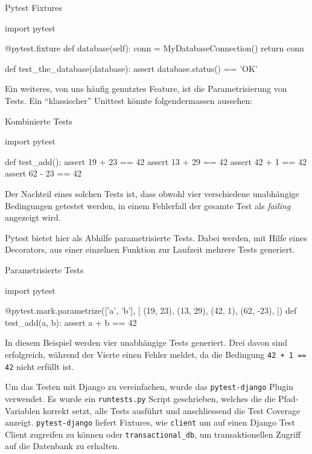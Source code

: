 \begin{listing}
\caption{Pytest Fixtures}
\label{improvements:pytest-fixtures}
\begin{pythoncode}
import pytest

@pytest.fixture
def database(self):
    conn = MyDatabaseConnection()
    return conn

def test_the_database(database):
    assert database.status() == 'OK'
\end{pythoncode}
\end{listing}

Ein weiteres, von uns häufig genutztes Feature, ist die Parametrisierung von
Tests. Ein \enquote{klassischer} Unittest könnte folgendermassen aussehen:

\begin{listing}
\caption{Kombinierte Tests}
\label{improvements:pytest-combined}
\begin{pythoncode}
import pytest

def test_add():
    assert 19 + 23 == 42
    assert 13 + 29 == 42
    assert 42 + 1 == 42
    assert 62 - 23 == 42
\end{pythoncode}
\end{listing}

Der Nachteil eines solchen Tests ist, dass obwohl vier verschiedene unabhängige
Bedingungen getestet werden, in einem Fehlerfall der gesamte Test als
\textit{failing} angezeigt wird.

Pytest bietet hier als Abhilfe parametrisierte Tests. Dabei werden, mit Hilfe eines
Decorators, aus einer einzelnen Funktion zur Laufzeit mehrere Tests generiert.

\begin{listing}
\caption{Parametrisierte Tests}
\label{improvements:pytest-parametrize}
\begin{pythoncode}
import pytest

@pytest.mark.parametrize(['a', 'b'], [
	(19, 23),
	(13, 29),
	(42, 1),
	(62, -23),
])
def test_add(a, b):
    assert a + b == 42
\end{pythoncode}
\end{listing}

In diesem Beispiel werden vier unabhängige Tests generiert. Drei davon sind
erfolgreich, während der Vierte einen Fehler meldet, da die Bedingung
\texttt{42 + 1 == 42} nicht erfüllt ist.

Um das Testen mit Django zu vereinfachen, wurde das \texttt{pytest-django}
Plugin verwendet. Es wurde ein \texttt{runtests.py} Script geschrieben, welches
die die Pfad-Variablen korrekt setzt, alle Tests ausführt und anschliessend die
Test Coverage anzeigt. \texttt{pytest-django} liefert Fixtures, wie \zb
\texttt{client} um auf einen Django Test Client zugreifen zu können oder
\texttt{transactional\_db}, um transaktionellen Zugriff auf die Datenbank zu
erhalten.

